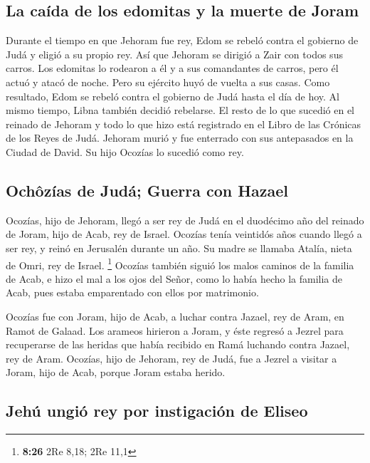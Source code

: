 \hypertarget{la-cauxedda-de-los-edomitas-y-la-muerte-de-joram}{%
\subsection{La caída de los edomitas y la muerte de
Joram}\label{la-cauxedda-de-los-edomitas-y-la-muerte-de-joram}}

 Durante el tiempo en que Jehoram fue rey, Edom se rebeló
contra el gobierno de Judá y eligió a su propio rey.  Así
que Jehoram se dirigió a Zair con todos sus carros. Los edomitas lo
rodearon a él y a sus comandantes de carros, pero él actuó y atacó de
noche. Pero su ejército huyó de vuelta a sus casas.  Como
resultado, Edom se rebeló contra el gobierno de Judá hasta el día de
hoy. Al mismo tiempo, Libna también decidió rebelarse. 
El resto de lo que sucedió en el reinado de Jehoram y todo lo que hizo
está registrado en el Libro de las Crónicas de los Reyes de Judá.
 Jehoram murió y fue enterrado con sus antepasados en la
Ciudad de David. Su hijo Ocozías lo sucedió como rey.

\hypertarget{ochuxf4zuxedas-de-juduxe1-guerra-con-hazael}{%
\subsection{Ochôzías de Judá; Guerra con
Hazael}\label{ochuxf4zuxedas-de-juduxe1-guerra-con-hazael}}

 Ocozías, hijo de Jehoram, llegó a ser rey de Judá en el
duodécimo año del reinado de Joram, hijo de Acab, rey de Israel.
 Ocozías tenía veintidós años cuando llegó a ser rey, y
reinó en Jerusalén durante un año. Su madre se llamaba Atalía, nieta de
Omri, rey de Israel. \footnote{\textbf{8:26} 2Re 8,18; 2Re 11,1}
 Ocozías también siguió los malos caminos de la familia
de Acab, e hizo el mal a los ojos del Señor, como lo había hecho la
familia de Acab, pues estaba emparentado con ellos por matrimonio.

 Ocozías fue con Joram, hijo de Acab, a luchar contra
Jazael, rey de Aram, en Ramot de Galaad. Los arameos hirieron a Joram,
 y éste regresó a Jezrel para recuperarse de las heridas
que había recibido en Ramá luchando contra Jazael, rey de Aram. Ocozías,
hijo de Jehoram, rey de Judá, fue a Jezrel a visitar a Joram, hijo de
Acab, porque Joram estaba herido.

\hypertarget{jehuxfa-ungiuxf3-rey-por-instigaciuxf3n-de-eliseo}{%
\subsection{Jehú ungió rey por instigación de
Eliseo}\label{jehuxfa-ungiuxf3-rey-por-instigaciuxf3n-de-eliseo}}

